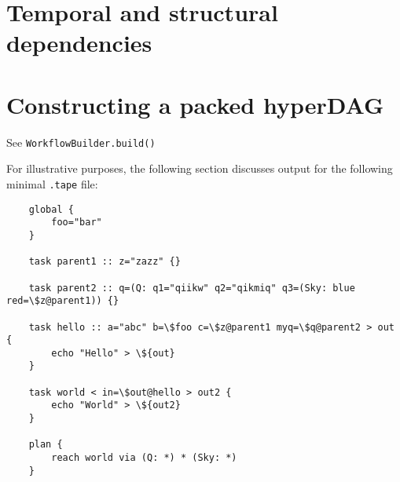 \documentclass{report}
\begin{document}
\section{Temporal and structural dependencies}

\section{Constructing a packed hyperDAG}

See \texttt{WorkflowBuilder.build()} 

For illustrative purposes, the following section discusses output for the following minimal \texttt{.tape} file:

\begin{verbatim}
    global {
        foo="bar"
    }
	
    task parent1 :: z="zazz" {}
	
    task parent2 :: q=(Q: q1="qiikw" q2="qikmiq" q3=(Sky: blue red=\$z@parent1)) {}
	
    task hello :: a="abc" b=\$foo c=\$z@parent1 myq=\$q@parent2 > out {
        echo "Hello" > \${out}
    }
	
    task world < in=\$out@hello > out2 {
        echo "World" > \${out2}
    }
	
    plan {
        reach world via (Q: *) * (Sky: *)
    }
\end{verbatim}
\end{document}
